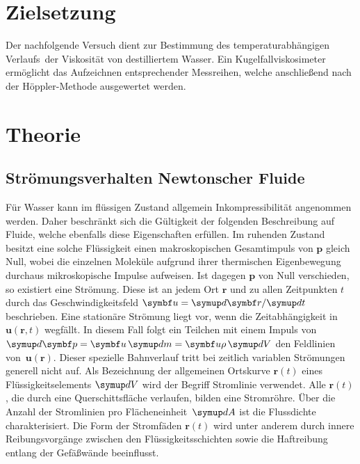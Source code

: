 \section{Zielsetzung}

Der nachfolgende Versuch dient zur Bestimmung des temperaturabhängigen \mbox{Verlaufs der} Viskosität von destilliertem
Wasser. Ein Kugelfallviskosimeter ermöglicht das \mbox{Aufzeichnen} entsprechender Messreihen, welche anschließend nach
der Höppler\hspace{0.05ex}-\hspace{-0.05ex}Methode ausgewertet werden.

\section{Theorie}
\label{sec:theorie}

\subsection[Strömungsverhalten Newtonscher Fluide]{Strömungsverhalten Newtonscher Fluide \textnormal{\cite{dem_exp_1_8}}}

Für Wasser kann im flüssigen Zustand allgemein Inkompressibilität angenommen werden. Daher beschränkt sich die Gültigkeit
der folgenden Beschreibung auf Fluide, welche ebenfalls diese Eigenschaften erfüllen. Im ruhenden Zustand besitzt eine
solche Flüssigkeit einen makroskopischen Gesamtimpuls von $\symbf p$ gleich Null, wobei die einzelnen Moleküle aufgrund
ihrer thermischen Eigenbewegung durchaus mikroskopische Impulse aufweisen. Ist dagegen $\symbf p$ von Null verschieden,
so existiert eine Strömung. Diese ist an jedem Ort $\symbf r$ und zu allen Zeitpunkten $t$ durch das Geschwindigkeitsfeld
$\symbf u = \symup d \symbf r \hspace{-0.05ex}/ \symup dt$ beschrieben. Eine stationäre Strömung liegt vor, wenn die
Zeitabhängigkeit in $\symbf u(\symbf r,t)$ wegfällt. In diesem Fall folgt ein Teilchen mit einem Impuls von
$\symup d \symbf p = \symbf u \, \symup dm = \symbf u \rho \, \symup dV$ den Feldlinien \mbox{von $\symbf u(\symbf r)$.}
Dieser spezielle Bahnverlauf tritt bei zeitlich variablen Strömungen generell nicht auf. Als Bezeichnung der allgemeinen
Ortskurve $\symbf r(t)$ eines Flüssigkeitselements $\symup dV$ wird der Begriff Stromlinie verwendet. Alle $\symbf r(t)$,
die durch eine Querschittsfläche verlaufen, bilden eine Stromröhre. Über die Anzahl der Stromlinien pro \mbox{Flächeneinheit
$\symup dA$} ist die Flussdichte charakterisiert. Die Form der Stromfäden $\symbf r(t)$ wird unter anderem durch innere
Reibungsvorgänge zwischen den Flüssigkeitsschichten sowie die Haftreibung entlang der Gefäßwände beeinflusst.

